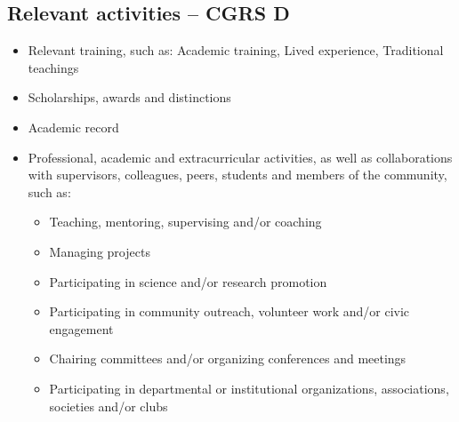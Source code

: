 \documentclass{article}
\begin{document}
\subsection*{Relevant activities – CGRS D}

\begin{itemize}
    \item Relevant training, such as: Academic training, Lived experience, Traditional teachings

    \item Scholarships, awards and distinctions

    \item Academic record

    \item Professional, academic and extracurricular activities, as well as collaborations with supervisors, colleagues, peers, students and members of the community, such as:
    \begin{itemize}
        \item Teaching, mentoring, supervising and/or coaching
        \item Managing projects
        \item Participating in science and/or research promotion
        \item Participating in community outreach, volunteer work and/or civic engagement
        \item Chairing committees and/or organizing conferences and meetings
        \item Participating in departmental or institutional organizations, associations, societies and/or clubs
    \end{itemize}
\end{itemize}


%
\end{document}
